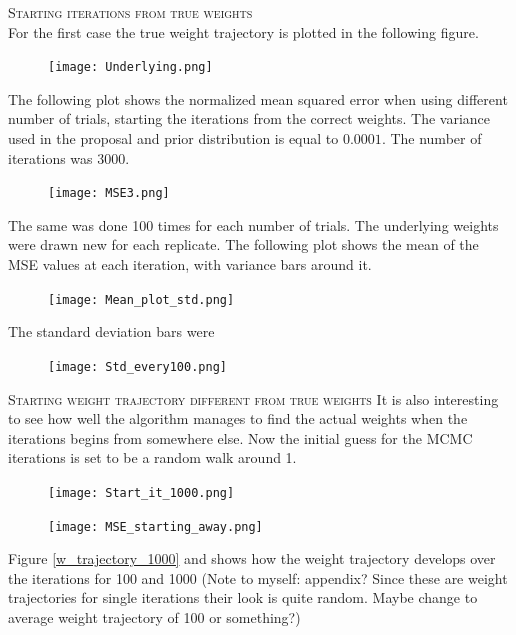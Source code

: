 \textsc{Starting iterations from true weights}\\
For the first case the true weight trajectory is plotted in the following figure. 


\begin{figure}[hbt!]
    \centering
    \texttt{[image: Underlying.png]}
\end{figure}

The following plot shows the normalized mean squared error when using different number of trials, starting the iterations from the correct weights. The variance used in the proposal and prior distribution is equal to $0.0001$. The number of iterations was 3000.

\begin{figure}[hbt!]
    \centering
    \texttt{[image: MSE3.png]}
\end{figure}

The same was done 100 times for each number of trials. The underlying weights were drawn new for each replicate. The following plot shows the mean of the MSE values at each iteration, with variance bars around it. 

\begin{figure}[hbt!]
    \centering
    \texttt{[image: Mean\_plot\_std.png]}
\end{figure}

The standard deviation bars were 

\begin{figure}[hbt!]
    \centering
    \texttt{[image: Std\_every100.png]}
\end{figure}

\textsc{Starting weight trajectory different from true weights}
It is also interesting to see how well the algorithm manages to find the actual weights when the iterations begins from somewhere else. Now the initial guess for the MCMC iterations is set to be a random walk around 1.

\begin{figure}[hbt!]
    \centering
    \texttt{[image: Start\_it\_1000.png]}
\end{figure}


\begin{figure}[hbt!]
    \centering
    \texttt{[image: MSE\_starting\_away.png]}
\end{figure}

Figure \ref{w_trajectory_1000} and  shows how the weight trajectory develops over the iterations for 100 and 1000  (Note to myself: appendix? Since these are weight trajectories for single iterations their look is quite random. Maybe change to average weight trajectory of 100 or something?)

